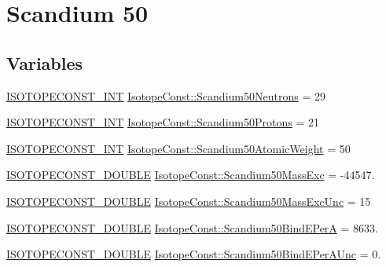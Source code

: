 \hypertarget{group___isotope_const-_scandium-_sc50}{}\section{Scandium 50}
\label{group___isotope_const-_scandium-_sc50}
\subsection*{Variables}
\begin{DoxyCompactItemize}
\item 
\mbox{\hyperlink{group___isotope_const-_macros_ga5f18360b3e99483a35c32d789e62621c}{I\+S\+O\+T\+O\+P\+E\+C\+O\+N\+S\+T\+\_\+\+I\+NT}} \mbox{\hyperlink{group___isotope_const-_scandium-_sc50_gabd4df663cae2effac3af1331ddca2a24}{Isotope\+Const\+::\+Scandium50\+Neutrons}} = 29
\item 
\mbox{\hyperlink{group___isotope_const-_macros_ga5f18360b3e99483a35c32d789e62621c}{I\+S\+O\+T\+O\+P\+E\+C\+O\+N\+S\+T\+\_\+\+I\+NT}} \mbox{\hyperlink{group___isotope_const-_scandium-_sc50_ga7c59f490117f7bad75000ead6ab72c63}{Isotope\+Const\+::\+Scandium50\+Protons}} = 21
\item 
\mbox{\hyperlink{group___isotope_const-_macros_ga5f18360b3e99483a35c32d789e62621c}{I\+S\+O\+T\+O\+P\+E\+C\+O\+N\+S\+T\+\_\+\+I\+NT}} \mbox{\hyperlink{group___isotope_const-_scandium-_sc50_ga93b40f5ab640872362070074bba73ca3}{Isotope\+Const\+::\+Scandium50\+Atomic\+Weight}} = 50
\item 
\mbox{\hyperlink{group___isotope_const-_macros_ga8f45a7272ce02c0b4c65c44636ed719a}{I\+S\+O\+T\+O\+P\+E\+C\+O\+N\+S\+T\+\_\+\+D\+O\+U\+B\+LE}} \mbox{\hyperlink{group___isotope_const-_scandium-_sc50_gae8b0638e87c8f7e2a45e95d4fb902367}{Isotope\+Const\+::\+Scandium50\+Mass\+Exc}} = -\/44547.
\item 
\mbox{\hyperlink{group___isotope_const-_macros_ga8f45a7272ce02c0b4c65c44636ed719a}{I\+S\+O\+T\+O\+P\+E\+C\+O\+N\+S\+T\+\_\+\+D\+O\+U\+B\+LE}} \mbox{\hyperlink{group___isotope_const-_scandium-_sc50_ga7d03341b2f1467a0d2b316025ecad893}{Isotope\+Const\+::\+Scandium50\+Mass\+Exc\+Unc}} = 15
\item 
\mbox{\hyperlink{group___isotope_const-_macros_ga8f45a7272ce02c0b4c65c44636ed719a}{I\+S\+O\+T\+O\+P\+E\+C\+O\+N\+S\+T\+\_\+\+D\+O\+U\+B\+LE}} \mbox{\hyperlink{group___isotope_const-_scandium-_sc50_gab37ecd7379fb1a78dd1f5520ce85054b}{Isotope\+Const\+::\+Scandium50\+Bind\+E\+PerA}} = 8633.
\item 
\mbox{\hyperlink{group___isotope_const-_macros_ga8f45a7272ce02c0b4c65c44636ed719a}{I\+S\+O\+T\+O\+P\+E\+C\+O\+N\+S\+T\+\_\+\+D\+O\+U\+B\+LE}} \mbox{\hyperlink{group___isotope_const-_scandium-_sc50_gaa9a67dc81960282581edafb930ed69f4}{Isotope\+Const\+::\+Scandium50\+Bind\+E\+Per\+A\+Unc}} = 0.

\end{DoxyCompactItemize}
